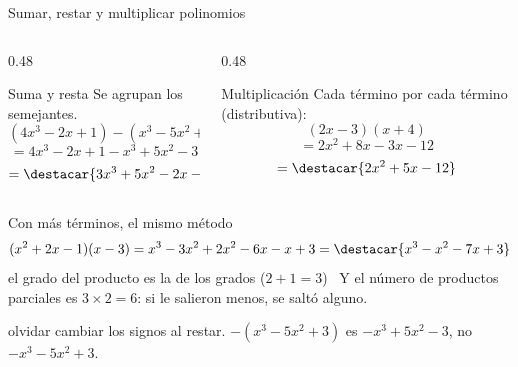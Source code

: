 \documentclass[aspectratio=169,10pt]{beamer}
\begin{document}
\begin{frame}{Sumar, restar y multiplicar polinomios}
  \scriptsize
  \begin{columns}[T,onlytextwidth]
    \begin{column}{0.48\textwidth}
      \begin{exampleblock}{Suma y resta}
        \tiny
        Se agrupan los semejantes. 
        \[ (4x^{3}-2x+1)-(x^{3}-5x^{2}+3) \]
        \[ = 4x^{3}-2x+1-x^{3}+5x^{2}-3 \]
        \[ = \destacar{3x^{3}+5x^{2}-2x-2} \]
      \end{exampleblock}
    \end{column}
    \begin{column}{0.48\textwidth}
      \begin{exampleblock}{Multiplicación}
        \tiny
        Cada término por cada término (distributiva):
        \[ (2x-3)(x+4) \]
        \[ = 2x^{2}+8x-3x-12 \]
        \[ = \destacar{2x^{2}+5x-12} \]
      \end{exampleblock}
    \end{column}
  \end{columns}

  \vspace{0.12cm}
  \begin{block}{Con más términos, el mismo método}
    \tiny
    \[ (x^{2}+2x-1)(x-3)
     = x^{3}-3x^{2}+2x^{2}-6x-x+3
     = \destacar{x^{3}-x^{2}-7x+3} \]
     el grado del producto es la  de los grados
    ($2+1=3$) \checkmark \ Y el número de productos parciales es
    $3\times 2 = 6$: si le salieron menos, se saltó alguno.
  \end{block}

  \vspace{0.05cm}
  {\tiny\color{uniGris}  olvidar cambiar
   los signos al restar. $-(x^{3}-5x^{2}+3)$ es
  $-x^{3}+5x^{2}-3$, no $-x^{3}-5x^{2}+3$.}
\end{frame}

\end{document}
